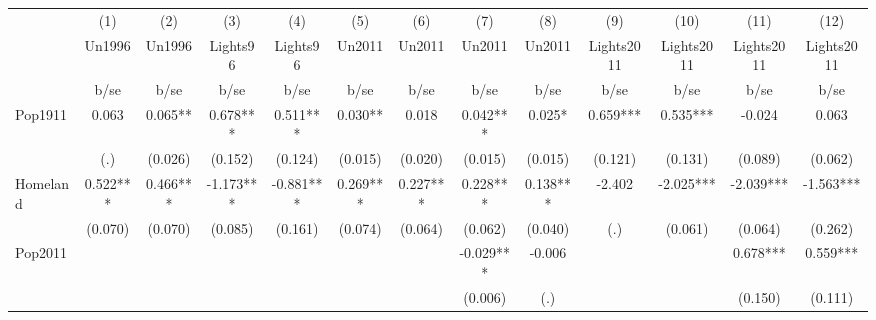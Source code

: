 {
\def\sym#1{\ifmmode^{#1}\else\(^{#1}\)\fi}
\begin{tabular}{l*{12}{c}}
\hline\hline
                    &\multicolumn{1}{c}{(1)}&\multicolumn{1}{c}{(2)}&\multicolumn{1}{c}{(3)}&\multicolumn{1}{c}{(4)}&\multicolumn{1}{c}{(5)}&\multicolumn{1}{c}{(6)}&\multicolumn{1}{c}{(7)}&\multicolumn{1}{c}{(8)}&\multicolumn{1}{c}{(9)}&\multicolumn{1}{c}{(10)}&\multicolumn{1}{c}{(11)}&\multicolumn{1}{c}{(12)}\\
                    &\multicolumn{1}{c}{Un1996}&\multicolumn{1}{c}{Un1996}&\multicolumn{1}{c}{Lights96}&\multicolumn{1}{c}{Lights96}&\multicolumn{1}{c}{Un2011}&\multicolumn{1}{c}{Un2011}&\multicolumn{1}{c}{Un2011}&\multicolumn{1}{c}{Un2011}&\multicolumn{1}{c}{Lights2011}&\multicolumn{1}{c}{Lights2011}&\multicolumn{1}{c}{Lights2011}&\multicolumn{1}{c}{Lights2011}\\
                    &        b/se   &        b/se   &        b/se   &        b/se   &        b/se   &        b/se   &        b/se   &        b/se   &        b/se   &        b/se   &        b/se   &        b/se   \\
\hline
Pop1911             &       0.063   &       0.065** &       0.678***&       0.511***&       0.030** &       0.018   &       0.042***&       0.025*  &       0.659***&       0.535***&      -0.024   &       0.063   \\
                    &         (.)   &     (0.026)   &     (0.152)   &     (0.124)   &     (0.015)   &     (0.020)   &     (0.015)   &     (0.015)   &     (0.121)   &     (0.131)   &     (0.089)   &     (0.062)   \\
Homeland            &       0.522***&       0.466***&      -1.173***&      -0.881***&       0.269***&       0.227***&       0.228***&       0.138***&      -2.402   &      -2.025***&      -2.039***&      -1.563***\\
                    &     (0.070)   &     (0.070)   &     (0.085)   &     (0.161)   &     (0.074)   &     (0.064)   &     (0.062)   &     (0.040)   &         (.)   &     (0.061)   &     (0.064)   &     (0.262)   \\
Pop2011             &               &               &               &               &               &               &      -0.029***&      -0.006   &               &               &       0.678***&       0.559***\\
                    &               &               &               &               &               &               &     (0.006)   &         (.)   &               &               &     (0.150)   &     (0.111)   \\

\end{tabular}}
